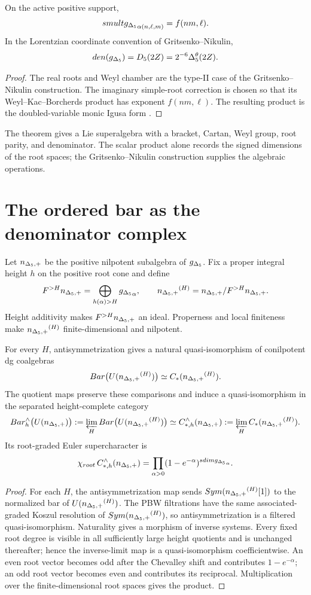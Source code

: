 \begin{theorem}
On the active positive support,
\[
 smult{g_{\Delta_5}}_{\alpha(n,\ell,m)}=f(nm,\ell).
\]
In the Lorentzian coordinate convention of Gritsenko--Nikulin,
\[
 den({g_{\Delta_5}})={D_5}(2Z)=2^{-6}{\Delta^{\theta}_5}(2Z).
\]
\end{theorem}
\begin{proof}
The real roots and Weyl chamber are the type-II case of the Gritsenko--Nikulin construction. The imaginary simple-root correction is chosen so that its Weyl--Kac--Borcherds product has exponent $f(nm,\ell)$. The resulting product is the doubled-variable monic Igusa form \cite{GN97,GN98a,GN98b}.
\end{proof}

The theorem gives a Lie superalgebra with a bracket, Cartan, Weyl group, root parity, and denominator. The scalar product alone records the signed dimensions of the root spaces; the Gritsenko--Nikulin construction supplies the algebraic operations.

\chapter{The ordered bar as the denominator complex}
Let ${n_{\Delta_5,+}}$ be the positive nilpotent subalgebra of ${g_{\Delta_5}}$. Fix a proper integral height $h$ on the positive root cone and define
\[
 F^{>H}{n_{\Delta_5,+}}=\bigoplus_{h(\alpha)>H}{g_{\Delta_5}}_\alpha,
 \qquad
 {n_{\Delta_5,+}}^{(H)}={n_{\Delta_5,+}}/F^{>H}{n_{\Delta_5,+}}.
\]
Height additivity makes $F^{>H}{n_{\Delta_5,+}}$ an ideal. Properness and local finiteness make ${n_{\Delta_5,+}}^{(H)}$ finite-dimensional and nilpotent.

\begin{theorem}
For every $H$, antisymmetrization gives a natural quasi-isomorphism of conilpotent dg coalgebras
\[
 Bar\bigl(U({n_{\Delta_5,+}}^{(H)})\bigr)\simeq C_*({n_{\Delta_5,+}}^{(H)}).
\]
The quotient maps preserve these comparisons and induce a quasi-isomorphism in the separated height-complete category
\[
 Bar_h^\wedge\bigl(U({n_{\Delta_5,+}})\bigr)
 :=\varprojlim_HBar\bigl(U({n_{\Delta_5,+}}^{(H)})\bigr)
 \simeq
 C_{*,h}^\wedge({n_{\Delta_5,+}})
 :=\varprojlim_H C_*({n_{\Delta_5,+}}^{(H)}).
\]
Its root-graded Euler supercharacter is
\[
 \chi_{root}\,C_{*,h}^\wedge({n_{\Delta_5,+}})
 =\prod_{\alpha>0}
 (1-e^{-\alpha})^{sdim{g_{\Delta_5}}_\alpha}.
\]
\end{theorem}
\begin{proof}
For each $H$, the antisymmetrization map sends $Sym({n_{\Delta_5,+}}^{(H)}[1])$ to the normalized bar of $U({n_{\Delta_5,+}}^{(H)})$. The PBW filtrations have the same associated-graded Koszul resolution of $Sym({n_{\Delta_5,+}}^{(H)})$, so antisymmetrization is a filtered quasi-isomorphism. Naturality gives a morphism of inverse systems. Every fixed root degree is visible in all sufficiently large height quotients and is unchanged thereafter; hence the inverse-limit map is a quasi-isomorphism coefficientwise. An even root vector becomes odd after the Chevalley shift and contributes $1-e^{-\alpha}$; an odd root vector becomes even and contributes its reciprocal. Multiplication over the finite-dimensional root spaces gives the product.
\end{proof}

